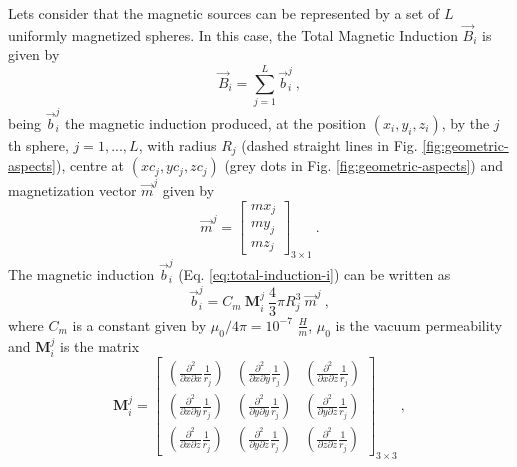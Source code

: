 \documentclass[journal abbreviation, npg]{copernicus}
\begin{document}
Lets consider that the magnetic sources can be represented by a set of $L$ uniformly magnetized spheres. In this case, the Total Magnetic Induction $\vec{B}_i$ is given by
\begin{equation}
\vec{B}_i = \sum_{j = 1}^{L} \vec{b}_{i}^{j} \: ,
\label{eq:total-induction-i}
\end{equation}
being $\vec{b}^{j}_{i}$ the magnetic induction produced, at the position $(x_{i}, y_{i}, z_{i})$, by the $j$th sphere, $j = 1, ..., L$, with radius $R_ {j}$ (dashed straight lines in Fig. \ref{fig:geometric-aspects}), centre at $(xc_{j}, yc_{j}, zc_{j})$ (grey dots in Fig. \ref{fig:geometric-aspects}) and magnetization vector $\vec{m}^{j}$ given by
\begin{equation}
\vec{m}^{j} =
\left[
\begin{array}{c}
mx_{j} \\
my_{j} \\
mz_{j}
\end{array}
\right]_ {3 \times 1} \: .
\label{eq:mag-vector-j}
\end{equation}
The magnetic induction $\vec{b}^{j}_{i}$ (Eq. \ref{eq:total-induction-i}) can be written as
\begin{equation}
\vec{b}^{j}_{i} = C_{m} \: \mathbf{M}_{i}^{j} \: 
                  \dfrac{4}{3} \pi R_{j}^{3} \:
                  \vec{m}^{j} \: ,
\label{eq:j-induction-i}
\end{equation}
where $C_{m}$ is a constant given by $\mu_{0} / {4 \pi}=10^{-7}$ $\frac{H}{m}$, $\mu_{0}$ is the vacuum permeability and $\mathbf{M}_{i}^{j}$ is the matrix 
\begin{equation}
\mathbf{M}^{j}_{i} =
\left[
\begin{array}{ccc}
\left( \frac{\partial^{2}}{\partial x \partial x} \frac{1}{r_{j}} \right) &
\left( \frac{\partial^{2}}{\partial x \partial y} \frac{1}{r_{j}} \right) &
\left( \frac{\partial^{2}}{\partial x \partial z} \frac{1}{r_{j}} \right) \\
\left( \frac{\partial^{2}}{\partial x \partial y} \frac{1}{r_{j}} \right) &
\left( \frac{\partial^{2}}{\partial y \partial y} \frac{1}{r_{j}} \right) &
\left( \frac{\partial^{2}}{\partial y \partial z} \frac{1}{r_{j}} \right) \\
\left( \frac{\partial^{2}}{\partial x \partial z} \frac{1}{r_{j}} \right) &
\left( \frac{\partial^{2}}{\partial y \partial z} \frac{1}{r_{j}} \right) &
\left( \frac{\partial^{2}}{\partial z \partial z} \frac{1}{r_{j}} \right)
\end{array}
\right]_{3 \times 3} \: ,
\label{eq:matrix-Mij}
\end{equation}
\end{document}
